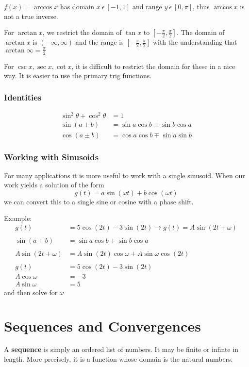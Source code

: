 \documentclass[12pt]{article}
\begin{document}
$f(x) = \arccos x$ has domain $x\ \epsilon\ [-1,1]$ and range $y\ \epsilon\ [0,\pi]$, thus $\arccos x$ is not a true inverse.

For $\arctan x$, we restrict the domain of $\tan x$ to $[-\frac{\pi}{2},\frac{\pi}{2}]$. The domain of $\arctan x$ is $(-\infty,\infty)$ and the range is $[-\frac{\pi}{2},\frac{\pi}{2}]$ with the understanding that $\arctan\infty = \frac{\pi}{2}$

For $\csc{x}, \sec{x}, \cot{x}$, it is difficult to restrict the domain for these in a nice way. It is easier to use the primary trig functions.

\subsubsection*{Identities}
\begin{align*}
\sin^2\theta + \cos^2\theta &= 1\\
\sin(a\pm b) &= \sin a\cos b \pm \sin b\cos a\\
\cos(a\pm b) &= \cos a\cos b \mp \sin a\sin b
\end{align*}

\subsubsection*{Working with Sinusoids}
For many applications it is more useful to work with a single sinusoid. When our work yields a solution of the form \[ g(t) = a\sin(\omega t) + b\cos(\omega t) \] we can convert this to a single sine or cosine with a phase shift.

Example:
\begin{align*}
g(t) &= 5\cos(2t) - 3\sin(2t) \to g(t) = A\sin(2t+\omega)\\\\
\sin(a+b) &= \sin a\cos b + \sin b\cos a\\\\
A\sin(2t+\omega) &= A\sin(2t)\cos\omega + A\sin\omega\cos(2t)\\\\
g(t) &= 5\cos(2t) - 3\sin(2t)\\
A\cos\omega &= -3\\
A\sin\omega &= 5
\end{align*}
and then solve for $\omega$

\section*{Sequences and Convergences}
A {\bf sequence} is simply an ordered list of numbers. It may be finite or infinte in length. More precisely, it is a function whose domain is the natural numbers.
\end{document}
